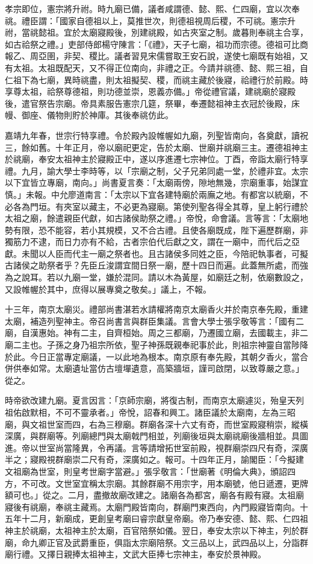 孝宗即位，憲宗將升祔。時九廟已備，議者咸謂德、懿、熙、仁四廟，宜以次奉祧。禮臣謂：「國家自德祖以上，莫推世次，則德祖視周后稷，不可祧。憲宗升祔，當祧懿祖。宜於太廟寢殿後，別建祧殿，如古夾室之制。歲暮則奉祧主合享，如古祫祭之禮。」吏部侍郎楊守陳言：「《禮》，天子七廟，祖功而宗德。德祖可比商報乙、周亞圉，非契、稷比。議者習見宋儒嘗取王安石說，遂使七廟既有始祖，又有太祖。太祖既配天，又不得正位南向，非禮之正。今請并祧德、懿、熙三祖，自仁祖下為七廟，異時祧盡，則太祖擬契、稷，而祧主藏於後寢，祫禮行於前殿。時享尊太祖，祫祭尊德祖，則功德並崇，恩義亦備。」帝從禮官議，建祧廟於寢殿後，遣官祭告宗廟。帝具素服告憲宗几筵，祭畢，奉遷懿祖神主衣冠於後殿，床幔、御座、儀物則貯於神庫。其後奉祧仿此。

嘉靖九年春，世宗行特享禮。令於殿內設帷幄如九廟，列聖皆南向，各奠獻，讀祝三，餘如舊。十年正月，帝以廟祀更定，告於太廟、世廟并祧廟三主。遷德祖神主於祧廟，奉安太祖神主於寢殿正中，遂以序進遷七宗神位。丁酉，帝詣太廟行特享禮。九月，諭大學士李時等，以「宗廟之制，父子兄弟同處一堂，於禮非宜。太宗以下宜皆立專廟，南向。」尚書夏言奏：「太廟兩傍，隙地無幾，宗廟重事，始謀宜慎。」未報。中允廖道南言：「太宗以下宜各建特廟於兩廡之地。有都宮以統廟，不必各為門垣。有夾室以藏主，不必更為寢廟。第使列聖各得全其尊，皇上躬行禮於太祖之廟，餘遣親臣代獻，如古諸侯助祭之禮。」帝悅，命會議。言等言：「太廟地勢有限，恐不能容，若小其規模，又不合古禮。且使各廟既成，陛下遍歷群廟，非獨筋力不逮，而日力亦有不給，古者宗伯代后獻之文，謂在一廟中，而代后之亞獻。未聞以人臣而代主一廟之祭者也。且古諸侯多同姓之臣，今陪祀執事者，可擬古諸侯之助祭者乎？先臣丘浚謂宜間日祭一廟，歷十四日而遍。此蓋無所處，而強為之說耳。若以九廟一堂，嫌於混同。請以木為黃屋，如廟廷之制，依廟數設之，又設帷幄於其中，庶得以展專奠之敬矣。」議上，不報。

十三年，南京太廟災。禮部尚書湛若水請權將南京太廟香火并於南京奉先殿，重建太廟，補造列聖神主。帝召尚書言與群臣集議。言會大學士張孚敬等言：「國有二廟，自漢惠始。神有二主，自齊桓始。周之三都廟，乃遷國立廟，去國載主，非二廟二主也。子孫之身乃祖宗所依，聖子神孫既親奉祀事於此，則祖宗神靈自當陟降於此。今日正當專定廟議，一以此地為根本。南京原有奉先殿，其朝夕香火，當合併供奉如常。太廟遺址當仿古壇墠遺意，高築牆垣，謹司啟閉，以致尊嚴之意。」從之。

時帝欲改建九廟。夏言因言：「京師宗廟，將復古制，而南京太廟遽災，殆皇天列祖佑啟默相，不可不靈承者。」帝悅，詔春和興工。諸臣議於太廟南，左為三昭廟，與文祖世室而四，右為三穆廟。群廟各深十六丈有奇，而世室殿寢稍崇，縱橫深廣，與群廟等。列廟總門與太廟戟門相並，列廟後垣與太廟祧廟後牆相並。具圖進。帝以世室尚當隆異，令再議。言等請增拓世室前殿，視群廟崇四尺有奇，深廣半之；寢殿視群廟崇二尺有奇，深廣如之。報可。十四年正月，諭閣臣：「今擬建文祖廟為世室，則皇考世廟字當避。」張孚敬言：「世廟著《明倫大典》，頒詔四方，不可改。文世室宜稱太宗廟。其餘群廟不用宗字，用本廟號，他日遞遷，更牌額可也。」從之。二月，盡撤故廟改建之。諸廟各為都宮，廟各有殿有寢。太祖廟寢後有祧廟，奉祧主藏焉。太廟門殿皆南向，群廟門東西向，內門殿寢皆南向。十五年十二月，新廟成，更創皇考廟曰睿宗獻皇帝廟。帝乃奉安德、懿、熙、仁四祖神主於祧廟，太祖神主於太廟，百官陪祭如儀。翌日，奉安太宗以下神主，列於群廟，命九卿正官及武爵重臣，俱詣太宗廟陪祭。文三品以上，武四品以上，分詣群廟行禮。又擇日親捧太祖神主，文武大臣捧七宗神主，奉安於景神殿。

